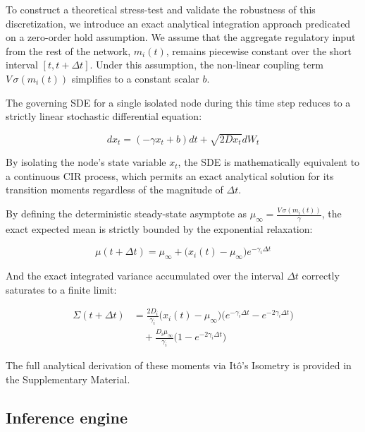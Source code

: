 \documentclass[10pt, aps, rmp,  twocolumn, superscriptaddress, floatfix, showkeys]{revtex4-2}
\begin{document}

To construct a theoretical stress-test and validate the robustness of this discretization, we introduce an exact analytical integration approach predicated on a zero-order hold assumption. We assume that the aggregate regulatory input from the rest of the network, $m_i(t)$, remains piecewise constant over the short interval $[t, t+\Delta t]$. Under this assumption, the non-linear coupling term $V \, \sigma(m_i(t))$ simplifies to a constant scalar $b$.

The governing SDE for a single isolated node during this time step reduces to a strictly linear stochastic differential equation:

\[ dx_t = (-\gamma x_t + b) dt + \sqrt{2D x_t} dW_t \]

By isolating the node's state variable $x_t$, the SDE is mathematically equivalent to a continuous CIR process, which permits an exact analytical solution for its transition moments regardless of the magnitude of $\Delta t$. 

    
By defining the deterministic steady-state asymptote as $\mu_\infty = \frac{V \, \sigma(m_i(t))}{\gamma}$, the exact expected mean is strictly bounded by the exponential relaxation:

\[ \mu(t+\Delta t) = \mu_\infty + \big(x_i(t) - \mu_\infty\big)e^{-\gamma_i \Delta t} \]

And the exact integrated variance accumulated over the interval $\Delta t$ correctly saturates to a finite limit:

\begin{equation}
    \begin{aligned}
    \Sigma(t+\Delta t) &= \frac{2D_i}{\gamma_i}\big(x_i(t) - \mu_\infty\big)\Big(e^{-\gamma_i \Delta t} - e^{-2\gamma_i \Delta t}\Big) \\
    &\quad + \frac{D_i \mu_\infty}{\gamma_i}\Big(1 - e^{-2\gamma_i \Delta t}\Big)
    \end{aligned}
\end{equation}

The full analytical derivation of these moments via Itô's Isometry is provided in the Supplementary Material.

\subsection{Inference engine}
\end{document}
